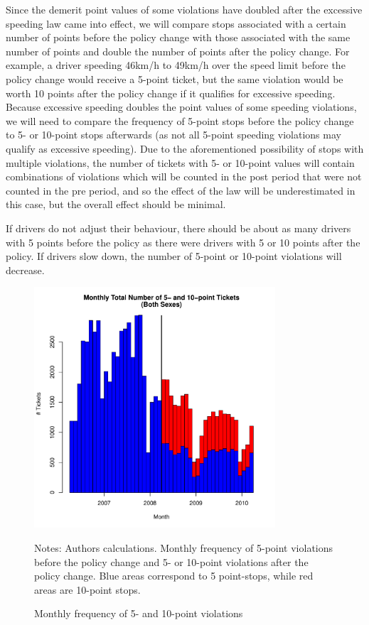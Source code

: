 Since the demerit point values of some violations have doubled 
after the excessive speeding law came into effect, 
we will compare stops associated with a certain number of points 
before the policy change with those associated with the 
same number of points and double the number of points after the policy change. 
For example, a driver speeding 46km/h to 49km/h over the speed limit 
before the policy change would receive a 5-point ticket, 
but the same violation would be worth 10 points after the policy change 
if it qualifies for excessive speeding. 
Because excessive speeding doubles the point values of some speeding violations, 
we will need to compare the frequency of 5-point stops before the policy change 
to 5- or 10-point stops afterwards 
(as not all 5-point speeding violations may qualify as excessive speeding). 
Due to the aforementioned possibility of stops with multiple violations, 
the number of tickets with 5- or 10-point values will contain 
combinations of violations which will be counted in the post period 
that were not counted in the pre period, and so the effect of the law 
will be underestimated in this case, but the overall effect should be minimal.

If drivers do not adjust their behaviour, 
there should be about as many drivers with 5 points before the policy 
as there were drivers with 5 or 10 points after the policy. 
If drivers slow down, the number of 5-point or 10-point violations will decrease. %



\begin{figure}
\centering
\includegraphics[width=0.8\textwidth]{Figures/num_pts_5_10_all_orig.pdf}
\caption{Monthly frequency of 5- and 10-point violations }
Notes: Authors calculations. 
Monthly frequency of 5-point violations before the policy change 
and 5- or 10-point violations after the policy change. 
Blue areas correspond to 5 point-stops, while red areas are 10-point stops.
\label{fig:num_pts_5_10_all}
\end{figure}


